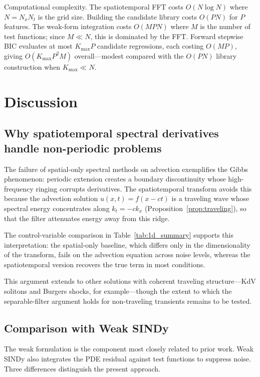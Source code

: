 \documentclass[preprint,12pt]{elsarticle}
\begin{document}
Computational complexity. The spatiotemporal FFT costs $O(N \log N)$ where $N = N_x N_t$ is the grid size. Building the candidate library costs $O(PN)$ for $P$ features. The weak-form integration costs $O(MPN)$ where $M$ is the number of test functions; since $M \ll N$, this is dominated by the FFT. Forward stepwise BIC evaluates at most $K_{\max}P$ candidate regressions, each costing $O(MP)$, giving $O(K_{\max} P^2 M)$ overall---modest compared with the $O(PN)$ library construction when $K_{\max} \ll N$.

\section{Discussion}
\label{sec:discussion}

\subsection{Why spatiotemporal spectral derivatives handle non-periodic problems}

The failure of spatial-only spectral methods on advection exemplifies the Gibbs phenomenon: periodic extension creates a boundary discontinuity whose high-frequency ringing corrupts derivatives. The spatiotemporal transform avoids this because the advection solution $u(x,t)=f(x-ct)$ is a traveling wave whose spectral energy concentrates along $k_t=-ck_x$ (Proposition~\ref{prop:traveling}), so that the filter attenuates energy away from this ridge.

The control-variable comparison in Table~\ref{tab:1d_summary} supports this interpretation: the spatial-only baseline, which differs only in the dimensionality of the transform, fails on the advection equation across noise levels, whereas the spatiotemporal version recovers the true term in most conditions.

This argument extends to other solutions with coherent traveling structure---KdV solitons and Burgers shocks, for example---though the extent to which the separable-filter argument holds for non-traveling transients remains to be tested.

\subsection{Comparison with Weak SINDy}

The weak formulation is the component most closely related to prior work. Weak SINDy \cite{messenger2021weak} also integrates the PDE residual against test functions to suppress noise. Three differences distinguish the present approach.
\end{document}
